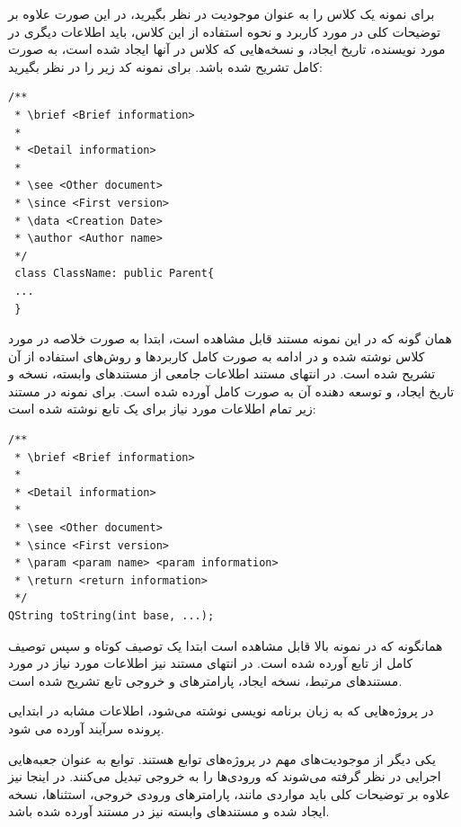 برای نمونه یک کلاس را به عنوان موجودیت در نظر بگیرید، در این صورت علاوه بر
توضیحات کلی در مورد کاربرد و نحوه استفاده از این کلاس، باید اطلاعات دیگری در
مورد نویسنده، تاریخ ایجاد، و نسخه‌هایی که کلاس در آنها ایجاد شده است، به صورت
کامل تشریح شده باشد. برای نمونه کد زیر را در نظر بگیرید:

\begin{latin}
\lstset{language=C++}  
\begin{lstlisting}[frame=single] 
/**
 * \brief <Brief information>
 * 
 * <Detail information>
 * 
 * \see <Other document>
 * \since <First version>
 * \data <Creation Date>
 * \author <Author name>
 */
 class ClassName: public Parent{
 ...
 }
\end{lstlisting}
\end{latin}

همان گونه که در این نمونه مستند قابل مشاهده است، ابتدا به صورت خلاصه در مورد
کلاس نوشته شده و در ادامه به صورت کامل کاربردها و روش‌های استفاده از آن تشریح
شده است. در انتهای مستند اطلاعات جامعی از مستند‌های وابسته، نسخه و
تاریخ ایجاد، و توسعه دهنده آن به صورت کامل آورده شده است. برای نمونه در مستند
زیر تمام اطلاعات مورد نیاز برای یک تابع نوشته شده است:

\begin{latin}
\lstset{language=C++}  
\begin{lstlisting}[frame=single] 
/**
 * \brief <Brief information>
 * 
 * <Detail information>
 * 
 * \see <Other document>
 * \since <First version>
 * \param <param name> <param information>
 * \return <return information>
 */
QString toString(int base, ...);
\end{lstlisting}
\end{latin}

همانگونه که در نمونه بالا قابل مشاهده است ابتدا یک توصیف کوتاه و سپس توصیف کامل
از تابع آورده شده است. در انتهای مستند نیز اطلاعات مورد نیاز در مورد مستندهای
مرتبط، نسخه ایجاد، پارامترهای و خروجی تابع تشریح شده است.

\begin{note}
در پروژه‌هایی که به زبان برنامه نویسی  نوشته می‌شود، اطلاعات مشابه در
ابتدایی پرونده سرآیند آورده می شود.
\end{note}

یکی دیگر از موجودیت‌های مهم در پروژه‌های  توابع هستند. توابع به عنوان
جعبه‌هایی اجرایی در نظر گرفته می‌شوند که ورودی‌ها را به خروجی تبدیل می‌کنند. در
اینجا نیز علاوه بر توضیحات کلی باید مواردی مانند، پارامترهای ورودی خروجی،
استثناها، نسخه‌ ایجاد شده و مستندهای وابسته نیز در مستند آورده شده باشد.


